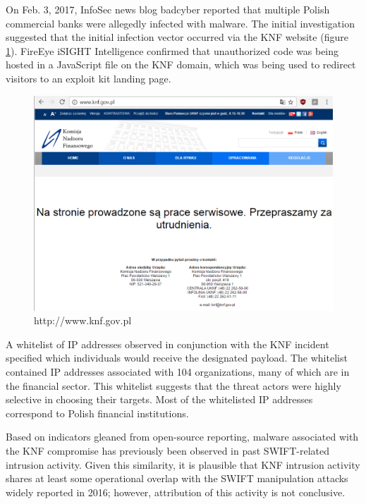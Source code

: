 \documentclass[12pt]{article}
\begin{document}
        On Feb. 3, 2017, InfoSec news blog badcyber reported that multiple Polish commercial banks were allegedly infected with malware. The initial investigation suggested that the initial infection vector occurred via the KNF website (figure \ref{fig:knf}). FireEye iSIGHT Intelligence confirmed that unauthorized code was being hosted in a JavaScript file on the KNF domain, which was being used to redirect visitors to an exploit kit landing page. 
        
        \begin{figure}[H]
        \centering
        \includegraphics[width=\textwidth]{figures/knf.png}
        \caption{http://www.knf.gov.pl}
        \label{fig:knf}
        \end{figure}
        
        A whitelist of IP addresses observed in conjunction with the KNF incident specified which individuals would receive the designated payload. The whitelist contained IP addresses associated with 104 organizations, many of which are in the financial sector. This whitelist suggests that the threat actors were highly selective in choosing their targets. Most of the whitelisted IP addresses correspond to Polish financial institutions. 
        
        Based on indicators gleaned from open-source reporting, malware associated with the KNF compromise has previously been observed in past SWIFT-related intrusion activity. Given this similarity, it is plausible that KNF intrusion activity shares at least some operational overlap with the SWIFT manipulation attacks widely reported in 2016; however, attribution of this activity is not conclusive.\cite{MungurkApt38}
       
\end{document}
